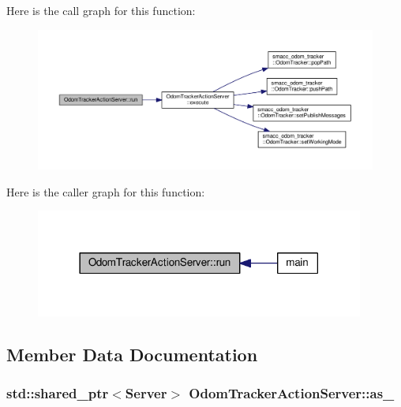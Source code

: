 Here is the call graph for this function\+:
\nopagebreak
\begin{figure}[H]
\begin{center}
\leavevmode
\includegraphics[width=350pt]{classOdomTrackerActionServer_a8ab6984c7383949a048d72437e9f79d3_cgraph}
\end{center}
\end{figure}




Here is the caller graph for this function\+:
\nopagebreak
\begin{figure}[H]
\begin{center}
\leavevmode
\includegraphics[width=306pt]{classOdomTrackerActionServer_a8ab6984c7383949a048d72437e9f79d3_icgraph}
\end{center}
\end{figure}




\subsection{Member Data Documentation}
\subsubsection[{\texorpdfstring{as\+\_\+}{as_}}]{\setlength{\rightskip}{0pt plus 5cm}std\+::shared\+\_\+ptr$<${\bf Server}$>$ Odom\+Tracker\+Action\+Server\+::as\+\_\+}\hypertarget{classOdomTrackerActionServer_a28bed1d95003d837b2b47053dbc66878}{}\label{classOdomTrackerActionServer_a28bed1d95003d837b2b47053dbc66878}


